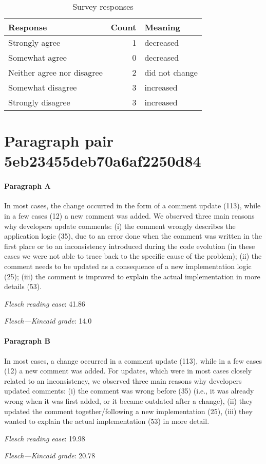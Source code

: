 \begin{table}[!h]
\centering
\begin{tabular}{lrl}
\toprule
          \textbf{Response} &  \textbf{Count} & \textbf{Meaning} \\
\midrule
             Strongly agree &               1 &        decreased \\
             Somewhat agree &               0 &        decreased \\
 Neither agree nor disagree &               2 &   did not change \\
          Somewhat disagree &               3 &        increased \\
          Strongly disagree &               3 &        increased \\
\bottomrule
\end{tabular}
\caption*{Survey responses}\end{table}


\newpage
\section{Paragraph pair 5eb23455deb70a6af2250d84}
\paragraph{Paragraph A}
In most cases, the change occurred in the form of a comment update (113), while in a few cases (12) a new comment was added. We observed three main reasons why developers update comments: (i) the comment wrongly describes the application logic (35), due to an error done when the comment was written in the first place or to an inconsistency introduced during the code evolution (in these cases we were not able to trace back to the specific cause of the problem); (ii) the comment needs to be updated as a consequence of a new implementation logic (25); (iii) the comment is improved to explain the actual implementation in more details (53).\par\medskip
\emph{Flesch reading ease}: 41.86\par
\emph{Flesch---Kincaid grade}: 14.0

\paragraph{Paragraph B}
In most cases, a change occurred in a comment update (113), while in a few cases (12) a new comment was added. For updates, which were in most cases closely related to an inconsistency, we observed three main reasons why developers updated comments: (i) the comment was wrong before (35) (i.e., it was already wrong when it was first added, or it became outdated after a change), (ii) they updated the comment together/following a new implementation (25), (iii) they wanted to explain the actual implementation (53) in more detail.\par\medskip
\emph{Flesch reading ease}: 19.98\par
\emph{Flesch---Kincaid grade}: 20.78

